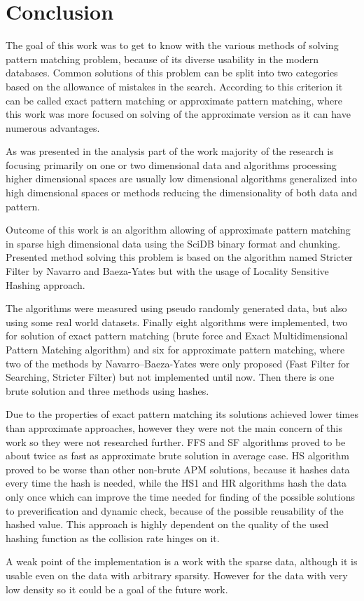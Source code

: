 \chapter{Conclusion} \label{conclusion}
The goal of this work was to get to know with the various methods of solving pattern matching problem, because of its diverse usability in the modern databases. Common solutions of this problem can be split into two categories based on the allowance of mistakes in the search. According to this criterion it can be called exact pattern matching or approximate pattern matching, where this work was more focused on solving of the approximate version as it can have numerous advantages. 

As was presented in the analysis part of the work majority of the research is focusing primarily on one or two dimensional data and algorithms processing higher dimensional spaces are usually low dimensional algorithms generalized into high dimensional spaces or methods reducing the dimensionality of both data and pattern. 

Outcome of this work is an algorithm allowing of approximate pattern matching in sparse high dimensional data using the SciDB binary format and chunking. Presented method solving this problem is based on the algorithm named Stricter Filter by Navarro and Baeza-Yates but with the usage of Locality Sensitive Hashing approach. 

The algorithms were measured using pseudo randomly generated data, but also using some real world datasets. Finally eight algorithms were implemented, two for solution of exact pattern matching (brute force and Exact Multidimensional Pattern Matching algorithm) and six for approximate pattern matching, where two of the methods by Navarro--Baeza-Yates were only proposed (Fast Filter for Searching, Stricter Filter) but not implemented until now. Then there is one brute solution and three methods using hashes.

Due to the properties of exact pattern matching its solutions achieved lower times than approximate approaches, however they were not the main concern of this work so they were not researched further.
FFS and SF algorithms proved to be about twice as fast as approximate brute solution in average case.
HS algorithm proved to be worse than other non-brute APM solutions, because it hashes data every time the hash is needed, while the HS1 and HR algorithms hash the data only once which can improve the time needed for finding of the possible solutions to preverification and dynamic check, because of the possible reusability of the hashed value. This approach is highly dependent on the quality of the used hashing function as the collision rate hinges on it.

A weak point of the implementation is a work with the sparse data, although it is usable even on the data with arbitrary sparsity. However for the data with very low density so it could be a goal of the future work. 